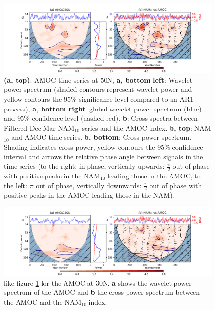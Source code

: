 \begin{center}
\begin{figure}[h!]
\noindent\includegraphics[width = \linewidth]{Figures/Figures-surface/AMOC_NAM_filtered_subplot.png}
\caption{\textbf{(a, top)}: AMOC time series at 50N, \textbf{a, bottom left}: Wavelet power spectrum (shaded contours represent wavelet power and yellow contours the 95\% significance level compared to an AR1 process), \textbf{a, bottom right}: global wavelet power spectrum (blue) and 95\% confidence level (dashed red). \textbf{b}: Cross spectra between Filtered Dec-Mar NAM$_{10}$ series and the AMOC index. \textbf{b, top}: NAM$_{10}$ and AMOC time series. \textbf{b, bottom}: Cross power spectrum. Shading indicates cross power, yellow contours the 95\% confidence interval and arrows the relative phase angle between signals in the time series (to the right: in phase, vertically upwards: $\frac{\pi}{2}$ out of phase with positive peaks in the NAM$_{10}$ leading those in the AMOC, to the left: $\pi$ out of phase, vertically downwards: $\frac{\pi}{2}$ out of phase with positive peaks in the AMOC leading those in the NAM).}
\label{NAM_AMOC_Cross}
\end{figure}
\end{center}

\begin{center}
\begin{figure}[h!]
\noindent\includegraphics[width = \linewidth]{Figures/Figures-surface/AMOC_NAM_filtered_subplot_30N.png}
\caption{like figure \ref{NAM_AMOC_Cross} for the AMOC at 30N. \textbf{a} shows the wavelet power spectrum of the AMOC and \textbf{b} the cross power spectrum between the AMOC and the NAM$_{10}$ index.}
\label{NAM_AMOC_Cross_30}
\end{figure}
\end{center}

